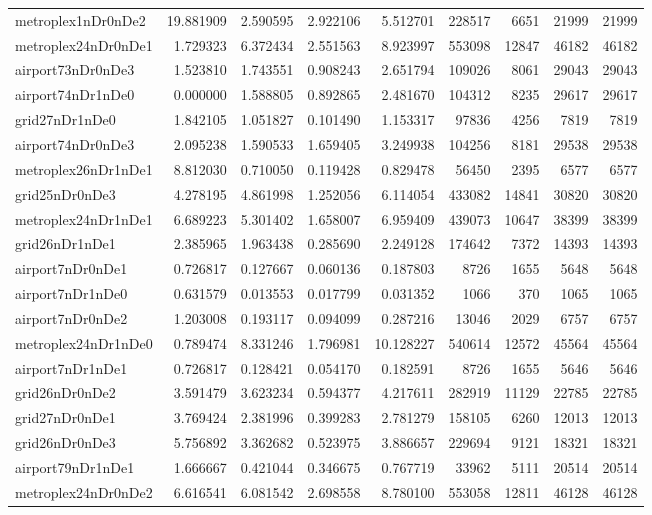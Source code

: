 \begin{longtable}{|l|r|r|r|r|r|r|r|r|}
metroplex1nDr0nDe2 & 19.881909 & 2.590595 & 2.922106 & 5.512701 & 228517 & 6651 & 21999 & 21999 \\
metroplex24nDr0nDe1 & 1.729323 & 6.372434 & 2.551563 & 8.923997 & 553098 & 12847 & 46182 & 46182 \\
airport73nDr0nDe3 & 1.523810 & 1.743551 & 0.908243 & 2.651794 & 109026 & 8061 & 29043 & 29043 \\
airport74nDr1nDe0 & 0.000000 & 1.588805 & 0.892865 & 2.481670 & 104312 & 8235 & 29617 & 29617 \\
grid27nDr1nDe0 & 1.842105 & 1.051827 & 0.101490 & 1.153317 & 97836 & 4256 & 7819 & 7819 \\
airport74nDr0nDe3 & 2.095238 & 1.590533 & 1.659405 & 3.249938 & 104256 & 8181 & 29538 & 29538 \\
metroplex26nDr1nDe1 & 8.812030 & 0.710050 & 0.119428 & 0.829478 & 56450 & 2395 & 6577 & 6577 \\
grid25nDr0nDe3 & 4.278195 & 4.861998 & 1.252056 & 6.114054 & 433082 & 14841 & 30820 & 30820 \\
metroplex24nDr1nDe1 & 6.689223 & 5.301402 & 1.658007 & 6.959409 & 439073 & 10647 & 38399 & 38399 \\
grid26nDr1nDe1 & 2.385965 & 1.963438 & 0.285690 & 2.249128 & 174642 & 7372 & 14393 & 14393 \\
airport7nDr0nDe1 & 0.726817 & 0.127667 & 0.060136 & 0.187803 & 8726 & 1655 & 5648 & 5648 \\
airport7nDr1nDe0 & 0.631579 & 0.013553 & 0.017799 & 0.031352 & 1066 & 370 & 1065 & 1065 \\
airport7nDr0nDe2 & 1.203008 & 0.193117 & 0.094099 & 0.287216 & 13046 & 2029 & 6757 & 6757 \\
metroplex24nDr1nDe0 & 0.789474 & 8.331246 & 1.796981 & 10.128227 & 540614 & 12572 & 45564 & 45564 \\
airport7nDr1nDe1 & 0.726817 & 0.128421 & 0.054170 & 0.182591 & 8726 & 1655 & 5646 & 5646 \\
grid26nDr0nDe2 & 3.591479 & 3.623234 & 0.594377 & 4.217611 & 282919 & 11129 & 22785 & 22785 \\
grid27nDr0nDe1 & 3.769424 & 2.381996 & 0.399283 & 2.781279 & 158105 & 6260 & 12013 & 12013 \\
grid26nDr0nDe3 & 5.756892 & 3.362682 & 0.523975 & 3.886657 & 229694 & 9121 & 18321 & 18321 \\
airport79nDr1nDe1 & 1.666667 & 0.421044 & 0.346675 & 0.767719 & 33962 & 5111 & 20514 & 20514 \\
metroplex24nDr0nDe2 & 6.616541 & 6.081542 & 2.698558 & 8.780100 & 553058 & 12811 & 46128 & 46128 \\

\end{longtable}
